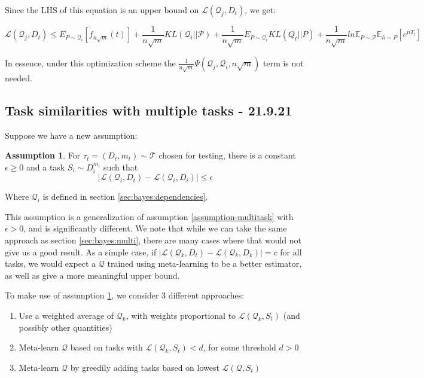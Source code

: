 \documentclass[letterpaper]{article}
\theoremstyle{definition}
\newtheorem{assumption}{Assumption}
\begin{document}
Since the LHS of this equation is an upper bound on $\mathcal{L}(\mathcal{Q}_j, D_t)$, we get:

$$\mathcal{L}(\mathcal{Q}_j, D_t) \leq E_{P\sim \mathcal{Q}_i} \left [ f_{n\sqrt{m}}(t) \right ]  + \frac{1}{n\sqrt{m}} KL(\mathcal{Q}_i||\mathcal{P}) +\frac{1}{n\sqrt{m}}E_{P\sim \mathcal{Q}_i} KL(Q_t||P) + \frac{1}{n\sqrt{m}} ln\mathbb{E}_{P\sim \mathcal{P}}\mathbb{E}_{h\sim P}\left [ e^{nT_t} \right ]$$

In essence, under this optimization scheme the $\frac{1}{n\sqrt{m}}\Psi(\mathcal{Q}_j, \mathcal{Q}_i, n\sqrt{m})$ term is not needed.

\subsection{Task similarities with multiple tasks - 21.9.21}

Suppose we have a new assumption:

\begin{assumption} \label{assumption-similarity}
	For $\tau_t=(D_t, m_t)\sim \mathcal{T}$ chosen for testing, there is a constant $\epsilon\geq 0$ and a task $S_i\sim D_i^{m_i}$ such that $$ \left |\mathcal{L}(\mathcal{Q}_i, D_t)-\mathcal{L}(\mathcal{Q}_i, D_i) \right |\leq \epsilon$$
	
	Where $\mathcal{Q}_i$ is defined in section \ref{sec:bayes:dependencies}.
\end{assumption} 

This assumption is a generalization of assumption \ref{assumption-multitask} with $\epsilon>0$, and is significantly different. We note that while we can take the same approach as section \ref{sec:bayes:multi}, there are many cases where that would not give us a good result. As a simple case, if $\left |\mathcal{L}(\mathcal{Q}_k, D_t)-\mathcal{L}(\mathcal{Q}_k, D_k) \right |=c$ for all tasks, we would expect a $\mathcal{Q}$ trained using meta-learning to be a better estimator, as well as give a more meaningful upper bound.

To make use of assumption \ref{assumption-similarity}, we consider 3 different approaches:

\begin{enumerate}
	\item Use a weighted average of $\mathcal{Q}_k$, with weights proportional to $\mathcal{L}(\mathcal{Q}_k, S_t)$ (and possibly other quantities)
	\item Meta-learn $\mathcal{Q}$ based on tasks with $\mathcal{L}(\mathcal{Q}_k, S_t)<d$, for some threshold $d>0$
	\item Meta-learn $\mathcal{Q}$ by greedily adding tasks based on lowest $\mathcal{L}(\mathcal{Q}, S_t)$
\end{enumerate}
\end{document}
